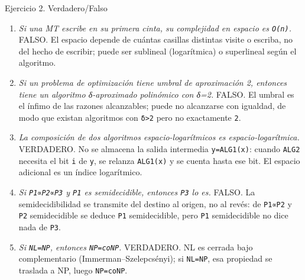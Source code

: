 \documentclass[12pt]{book} %
\providecommand{\tightlist}{%
  \setlength{\itemsep}{0pt}\setlength{\parskip}{0pt}}
\begin{document}
Ejercicio 2. Verdadero/Falso

\begin{enumerate}
\def\labelenumi{\arabic{enumi}.}
\tightlist
\item
  \emph{Si una MT escribe en su primera cinta, su complejidad en espacio
  es \texttt{O(n)}.} FALSO. El espacio depende de cuántas casillas
  distintas visite o escriba, no del hecho de escribir; puede ser
  sublineal (logarítmica) o superlineal según el algoritmo.
\item
  \emph{Si un problema de optimización tiene umbral de aproximación 2,
  entonces tiene un algoritmo δ-aproximado polinómico con δ=2.} FALSO.
  El umbral es el ínfimo de las razones alcanzables; puede no alcanzarse
  con igualdad, de modo que existan algoritmos con
  \texttt{δ\textgreater{}2} pero no exactamente \texttt{2}.
\item
  \emph{La composición de dos algoritmos espacio-logarítmicos es
  espacio-logarítmica.} VERDADERO. No se almacena la salida intermedia
  \texttt{y=ALG1(x)}: cuando \texttt{ALG2} necesita el bit \texttt{i} de
  \texttt{y}, se relanza \texttt{ALG1(x)} y se cuenta hasta ese bit. El
  espacio adicional es un índice logarítmico.
\item
  \emph{Si \texttt{P1∝P2∝P3} y \texttt{P1} es semidecidible, entonces
  \texttt{P3} lo es.} FALSO. La semidecidibilidad se transmite del
  destino al origen, no al revés: de \texttt{P1∝P2} y \texttt{P2}
  semidecidible se deduce \texttt{P1} semidecidible, pero \texttt{P1}
  semidecidible no dice nada de \texttt{P3}.
\item
  \emph{Si \texttt{NL=NP}, entonces \texttt{NP=coNP}.} VERDADERO. NL es
  cerrada bajo complementario (Immerman--Szelepcsényi); si
  \texttt{NL=NP}, esa propiedad se traslada a NP, luego
  \texttt{NP=coNP}.
\end{enumerate}
\end{document}

